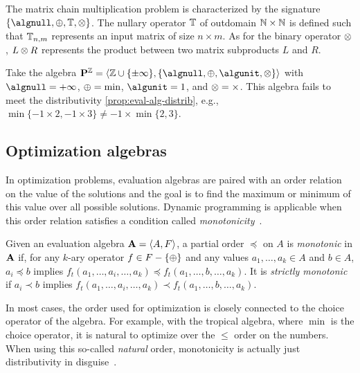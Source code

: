 \begin{example}
    The matrix chain multiplication problem is characterized by the signature \(\{\algnull, \algplus, \algterm, \algtimes\}\).
    The nullary operator \(\mathbb{T}\) of outdomain \(\mathbb{N} \times \mathbb{N}\) is defined such that \(\mathbb{T}_{n,m}\) represents an input matrix of size \(n \times m\).
    As for the binary operator \(\mathbin{\otimes}\), \(L \mathbin{\otimes} R\) represents the product between two matrix subproducts \(L\) and \(R\).
\end{example}

\begin{example}
    Take the algebra \(\alprod^{\rel} = \langle\relex,\allowbreak \{\algnull,\allowbreak \algplus,\allowbreak \algunit,\allowbreak \algtimes\}\rangle\)
    with \(\algnull = +\infty\), \(\mathbin{\oplus} = \min\), \(\algunit = 1\), and \(\mathbin{\otimes} = \times\).
    This algebra fails to meet the distributivity \cref{prop:eval-alg-distrib}, e.g., \(\min\{-1 \times 2, -1 \times 3\} \neq -1 \times \min\{2, 3\}\).
\end{example}

\subsection{Optimization algebras}

In optimization problems, evaluation algebras are paired with an order relation on the value of the solutions and the goal is to find the maximum or minimum of this value over all possible solutions.
Dynamic programming is applicable when this order relation satisfies a condition called \emph{monotonicity}~\parencite{Mitten1964CompositionPrinciplesSynthesis}.

\begin{definition}[Monotonicity]
    Given an evaluation algebra \(\mathbf{A} = \left\langle A, F\right\rangle\),
    a partial order \(\preceq\) on \(A\) is \emph{monotonic} in \(\mathbf{A}\)
    if, for any \(k\)-ary operator \(f \in F - \{\mathbin{\oplus}\}\)
    and any values \(a_1, \ldots, a_k \in A\) and \(b \in A\),
    \(a_i \preceq b\) implies
    \(f_t(a_1, \ldots, a_i, \ldots, a_k) \preceq f_t(a_1, \ldots, b, \ldots, a_k)\).
    It is \emph{strictly monotonic} if
    \(a_i \prec b\) implies
    \(f_t(a_1, \ldots, a_i, \ldots, a_k) \prec f_t(a_1, \ldots, b, \ldots, a_k)\).
\end{definition}

In most cases, the order used for optimization is closely connected to the choice operator of the algebra.
For example, with the tropical algebra, where \(\min\) is the choice operator, it is natural to optimize over the \(\le\) order on the numbers.
When using this so-called \emph{natural} order, monotonicity is actually just distributivity in disguise~\parencite{Huang2008AdvancedDynamicProgramming}.

